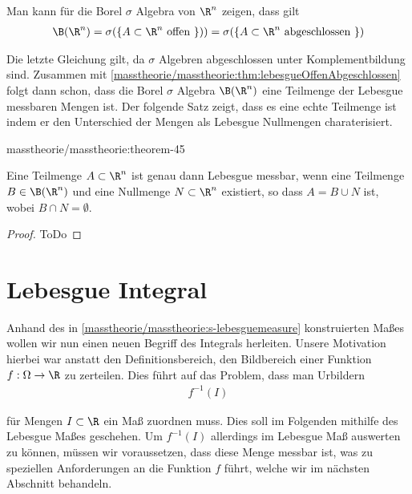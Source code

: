 \documentclass[letterpaper,10pt,german]{jupyterBook}
\begin{document}
\par
Man kann für die Borel \(\sigma\) Algebra von \(\R^n\) zeigen, dass gilt
\begin{align*}
\B(\R^n) = \sigma(\lbrace A \subset \R^n \text{ offen }\rbrace) ) = \sigma(\lbrace A \subset \R^n \text{ abgeschlossen }\rbrace)
\end{align*}
\par
Die letzte Gleichung gilt, da \(\sigma\) Algebren abgeschlossen unter Komplementbildung sind.
Zusammen mit \cref{masstheorie/masstheorie:thm:lebesgueOffenAbgeschlossen} folgt dann schon, dass die Borel \(\sigma\) Algebra \(\B(\R^n)\) eine Teilmenge der Lebesgue messbaren Mengen ist.
Der folgende Satz zeigt, dass es eine echte Teilmenge ist indem er den Unterschied der Mengen als Lebesgue Nullmengen charaterisiert.
\begin{theorem}{}{masstheorie/masstheorie:theorem-45}



\par
Eine Teilmenge \(A \subset \R^n\) ist genau dann Lebesgue messbar, wenn eine Teilmenge \(B \in \B(\R^n)\) und eine Nullmenge \(N \subset \R^n\) existiert, so dass \(A = B \cup N\) ist, wobei \(B\cap N=\emptyset\).
\end{theorem}

\begin{proof}
 ToDo
\end{proof}


\section{Lebesgue Integral}
\label{\detokenize{masstheorie/lebesgue_integral:lebesgue-integral}}\label{\detokenize{masstheorie/lebesgue_integral::doc}}
\par
Anhand des in \cref{masstheorie/masstheorie:s-lebesguemeasure}  konstruierten Maßes wollen wir nun einen neuen Begriff des Integrals herleiten. Unsere Motivation hierbei war anstatt den Definitionsbereich, den Bildbereich einer Funktion \(f:\Omega\to\R\) zu zerteilen. Dies führt auf das Problem, dass man Urbildern
\begin{align*}
f^{-1}(I)
\end{align*}
\par
für Mengen \(I\subset\R\) ein Maß zuordnen muss. Dies soll im Folgenden mithilfe des Lebesgue Maßes geschehen. Um \(f^{-1}(I)\) allerdings im Lebesgue Maß auswerten zu können, müssen wir voraussetzen, dass diese Menge messbar ist, was zu speziellen Anforderungen an die Funktion \(f\) führt, welche wir im nächsten Abschnitt behandeln.
\end{document}
